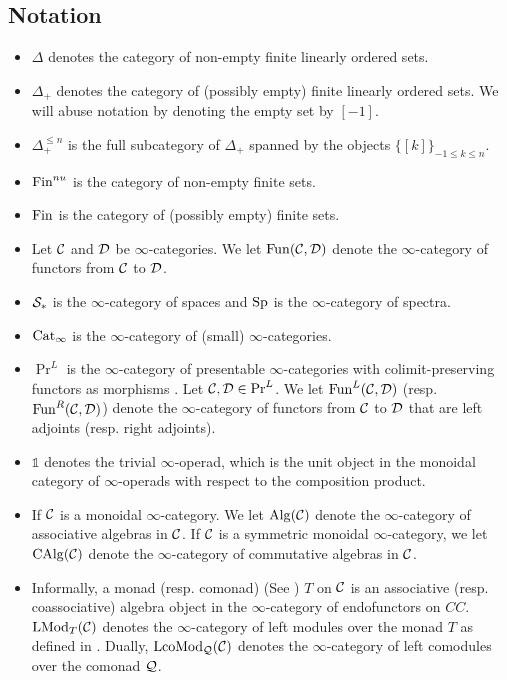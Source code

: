 \subsection{Notation}
\begin{itemize}
	\item $\Delta$ denotes the category of non-empty finite linearly ordered sets.
	\item $\Delta_{+}$ denotes the category of (possibly empty) finite linearly ordered sets. We will abuse notation by denoting the empty set by $[-1]$.
	\item $\Delta^{\leq n}_{+}$ is the full subcategory of $\Delta_{+}$ spanned by the objects $\{[k]\}_{-1\leq k\leq n}$.
	\item $\operatorname{Fin}^{nu}$ is the category of non-empty finite sets.
	\item $\operatorname{Fin}$ is the category of (possibly empty) finite sets. 
	\item Let ${\mathcal{C}}$ and ${\mathcal{D}}$ be $\infty$-categories. We let $\operatorname{Fun}({\mathcal{C}},{\mathcal{D}})$ denote the $\infty$-category of functors from ${\mathcal{C}}$ to ${\mathcal{D}}$.
	\item ${\mathcal{S}}_{*}$ is the $\infty$-category of spaces and $\operatorname{Sp}$ is the $\infty$-category of spectra.
	\item $\operatorname{Cat}_{\infty}$ is the $\infty$-category of (small) $\infty$-categories.
	\item $\Pr^{L}$ is the $\infty$-category of presentable $\infty$-categories with colimit-preserving functors as morphisms \cite[Definition 5.5.3.1.]{HTT}.
	Let ${\mathcal{C}},{\mathcal{D}} \in \Pr^L$. We let $\operatorname{Fun}^L({\mathcal{C}},{\mathcal{D}})$ (resp. $\operatorname{Fun}^{R}({\mathcal{C}}, {\mathcal{D}})$) denote  the $\infty$-category of functors from ${\mathcal{C}}$ to ${\mathcal{D}}$ that are left adjoints (resp. right adjoints).
	\item $\mathds{1}$ denotes the trivial $\infty$-operad, which is the unit object in the monoidal category of $\infty$-operads with respect to the composition product.
	\item If ${\mathcal{C}}$ is a monoidal $\infty$-category. We let $\operatorname{Alg}({\mathcal{C}})$ denote the $\infty$-category of associative algebras in ${\mathcal{C}}$.
	If ${\mathcal{C}}$ is a symmetric monoidal $\infty$-category, we let $\operatorname{CAlg}({\mathcal{C}})$ denote the 
	$\infty$-category of commutative algebras in ${\mathcal{C}}$.
	\item 
	Informally, a monad (resp. comonad) (See \cite[Definition 4.7.3.2.]{HA}) $T$ on ${\mathcal{C}}$ is an associative (resp. coassociative) algebra object in the $\infty$-category of endofunctors on $
	CC$. 
	$\operatorname{LMod}_{T}({\mathcal{C}})$ denotes the $\infty$-category of left modules over the monad $T$ as defined in \cite[Section 4.2]{HA}. Dually, $\operatorname{LcoMod}_{{\mathcal{Q}}}({\mathcal{C}})$ denotes the $\infty$-category of left comodules over the comonad ${\mathcal{Q}}$.
\end{itemize}